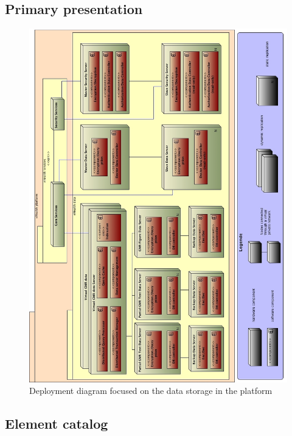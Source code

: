 \documentclass[a4paper,10pt]{article}
\begin{document}
\subsection{Primary presentation}
\begin{center}
    \begin{figure}[!h]
      \includegraphics[width=\textwidth]{../images/deployment_data.jpg}
	\caption{Deployment diagram focused on the data storage in the platform}
    \end{figure}
  \end{center}

\subsection{Element catalog}
\end{document}

